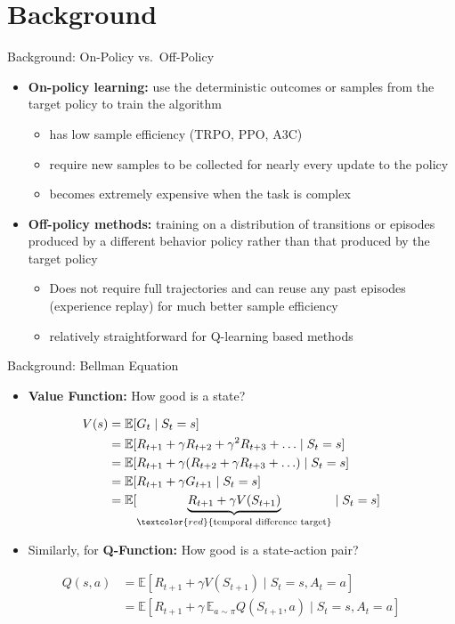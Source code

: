 \section{Background}
\begin{frame}{Background: On-Policy vs.\ Off-Policy}
\begin{itemize}
    \item \textbf{On-policy learning:} use the deterministic outcomes or samples from the target policy to train the algorithm
    \begin{itemize}
        \item has low sample efficiency (TRPO, PPO, A3C)
        \item require new samples to be collected for nearly every update to the policy
        \item becomes extremely expensive when the task is complex
    \end{itemize}
    \item \textbf{Off-policy methods:} training on a distribution of transitions or episodes produced by a different behavior policy rather than that produced by the target policy
    \begin{itemize}
        \item Does not require full trajectories and can reuse any past episodes (experience replay) for much better sample efficiency
        \item relatively straightforward for Q-learning based methods
    \end{itemize}
\end{itemize}
\end{frame}
\begin{frame}{Background: Bellman Equation}
\begin{itemize}
    \item \textbf{Value Function:} How good is a state?
\end{itemize}
\begin{align*}
V(s) &= \mathbb{E}[G_t \mid S_t = s] \\
     &= \mathbb{E}[R_{t+1} + \gamma R_{t+2} + \gamma^2 R_{t+3} + \ldots \mid S_t = s] \\
     &= \mathbb{E}[R_{t+1} + \gamma (R_{t+2} + \gamma R_{t+3} + \ldots) \mid S_t = s] \\
     &= \mathbb{E}[R_{t+1} + \gamma G_{t+1} \mid S_t = s] \\
     &= \mathbb{E}[\underbrace{R_{t+1} + \gamma V(S_{t+1})}_{\textcolor{red}{\text{temporal difference target}}} \mid S_t = s]
\end{align*}
\begin{itemize}
    \item Similarly, for \textbf{Q-Function:} How good is a state-action pair?
\end{itemize}
\begin{align*}
Q(s,a) &= \mathbb{E}[R_{t+1} + \gamma V(S_{t+1}) \mid S_t = s, A_t = a] \\
       &= \mathbb{E}[R_{t+1} + \gamma\, \mathbb{E}_{a \sim \pi} Q(S_{t+1}, a) \mid S_t = s, A_t = a]
\end{align*}
\end{frame}
